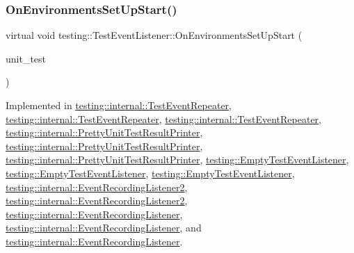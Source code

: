 \subsubsection{\texorpdfstring{OnEnvironmentsSetUpStart()}{OnEnvironmentsSetUpStart()}\hspace{0.1cm}{\footnotesize\ttfamily [3/3]}}
{\footnotesize\ttfamily virtual void testing\+::\+Test\+Event\+Listener\+::\+On\+Environments\+Set\+Up\+Start (\begin{DoxyParamCaption}\item[{const \mbox{\hyperlink{classtesting_1_1_unit_test}{Unit\+Test}} \&}]{unit\+\_\+test }\end{DoxyParamCaption})\hspace{0.3cm}{\ttfamily [pure virtual]}}



Implemented in \mbox{\hyperlink{classtesting_1_1internal_1_1_test_event_repeater_a739b5fd1f5bcb96b42089ff06281b3ea}{testing\+::internal\+::\+Test\+Event\+Repeater}}, \mbox{\hyperlink{classtesting_1_1internal_1_1_test_event_repeater_a739b5fd1f5bcb96b42089ff06281b3ea}{testing\+::internal\+::\+Test\+Event\+Repeater}}, \mbox{\hyperlink{classtesting_1_1internal_1_1_test_event_repeater_ae71819925adec0471fa7abc5072b8244}{testing\+::internal\+::\+Test\+Event\+Repeater}}, \mbox{\hyperlink{classtesting_1_1internal_1_1_pretty_unit_test_result_printer_ac17a4a708aca7df5876e48868408a2be}{testing\+::internal\+::\+Pretty\+Unit\+Test\+Result\+Printer}}, \mbox{\hyperlink{classtesting_1_1internal_1_1_pretty_unit_test_result_printer_ac17a4a708aca7df5876e48868408a2be}{testing\+::internal\+::\+Pretty\+Unit\+Test\+Result\+Printer}}, \mbox{\hyperlink{classtesting_1_1internal_1_1_pretty_unit_test_result_printer_af794208caa6ea4fcd91a4d4da0ec93c0}{testing\+::internal\+::\+Pretty\+Unit\+Test\+Result\+Printer}}, \mbox{\hyperlink{classtesting_1_1_empty_test_event_listener_a6e498ae763ac8c1a46bd861e0b7ff3f5}{testing\+::\+Empty\+Test\+Event\+Listener}}, \mbox{\hyperlink{classtesting_1_1_empty_test_event_listener_a6e498ae763ac8c1a46bd861e0b7ff3f5}{testing\+::\+Empty\+Test\+Event\+Listener}}, \mbox{\hyperlink{classtesting_1_1_empty_test_event_listener_a156d1965248fbdced6aabacadfa2d63f}{testing\+::\+Empty\+Test\+Event\+Listener}}, \mbox{\hyperlink{classtesting_1_1internal_1_1_event_recording_listener2_a555f80451b123922a7f21930e45a256f}{testing\+::internal\+::\+Event\+Recording\+Listener2}}, \mbox{\hyperlink{classtesting_1_1internal_1_1_event_recording_listener2_a555f80451b123922a7f21930e45a256f}{testing\+::internal\+::\+Event\+Recording\+Listener2}}, \mbox{\hyperlink{classtesting_1_1internal_1_1_event_recording_listener_ae192e9289f576fc770b549a575d8e786}{testing\+::internal\+::\+Event\+Recording\+Listener}}, \mbox{\hyperlink{classtesting_1_1internal_1_1_event_recording_listener_ae192e9289f576fc770b549a575d8e786}{testing\+::internal\+::\+Event\+Recording\+Listener}}, and \mbox{\hyperlink{classtesting_1_1internal_1_1_event_recording_listener_add61e6e7ebffb8afc90ccabcdc9f9982}{testing\+::internal\+::\+Event\+Recording\+Listener}}.

